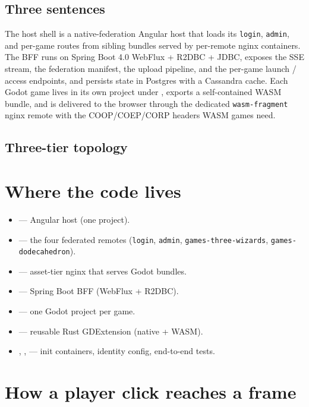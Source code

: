 \documentclass[11pt,a4paper,openany]{book}
\begin{document}
\section{Three sentences}
The host shell is a native-federation Angular host that loads its
\texttt{login}, \texttt{admin}, and per-game routes from sibling bundles
served by per-remote nginx containers. The BFF runs on Spring Boot 4.0
WebFlux + R2DBC + JDBC, exposes the SSE stream, the federation manifest,
the upload pipeline, and the per-game launch / access endpoints, and
persists state in Postgres with a Cassandra cache. Each Godot game
lives in its own project under , exports a
self-contained WASM bundle, and is delivered to the browser through
the dedicated \texttt{wasm-fragment} nginx remote with the COOP/COEP/CORP
headers WASM games need.

\section{Three-tier topology}

\chapter{Where the code lives}
\begin{itemize}
  \item {} — Angular host (one project).
  \item {} — the four federated remotes
        (\texttt{login}, \texttt{admin}, \texttt{games-three-wizards},
        \texttt{games-dodecahedron}).
  \item {} — asset-tier nginx that serves Godot
        bundles.
  \item {} — Spring Boot BFF (WebFlux + R2DBC).
  \item {} — one Godot project per game.
  \item {} — reusable Rust
        GDExtension (native + WASM).
  \item {}, ,  — init
        containers, identity config, end-to-end tests.
\end{itemize}

\chapter{How a player click reaches a frame}
\end{document}
